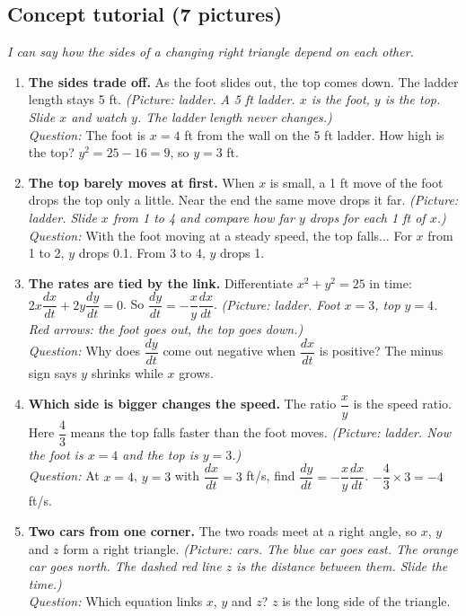 \documentclass[11pt]{article}
\begin{document}
\subsection*{Concept tutorial (7 pictures)}
\textit{I can say how the sides of a changing right triangle depend on each other.}\par
\begin{enumerate}
\item \textbf{The sides trade off.} As the foot slides out, the top comes down. The ladder length stays 5 ft. \textit{(Picture: ladder. A 5 ft ladder. $x$ is the foot, $y$ is the top. Slide $x$ and watch $y$. The ladder length never changes.)}\\ \textit{Question:} The foot is $x=4$ ft from the wall on the 5 ft ladder. How high is the top?  $y^2=25-16=9$, so $y=3$ ft.
\item \textbf{The top barely moves at first.} When $x$ is small, a 1 ft move of the foot drops the top only a little. Near the end the same move drops it far. \textit{(Picture: ladder. Slide $x$ from 1 to 4 and compare how far $y$ drops for each 1 ft of $x$.)}\\ \textit{Question:} With the foot moving at a steady speed, the top falls...  For $x$ from 1 to 2, $y$ drops 0.1. From 3 to 4, $y$ drops 1.
\item \textbf{The rates are tied by the link.} Differentiate $x^2+y^2=25$ in time: $2x\dfrac{dx}{dt}+2y\dfrac{dy}{dt}=0$. So $\dfrac{dy}{dt}=-\dfrac{x}{y}\dfrac{dx}{dt}$. \textit{(Picture: ladder. Foot $x=3$, top $y=4$. Red arrows: the foot goes out, the top goes down.)}\\ \textit{Question:} Why does $\dfrac{dy}{dt}$ come out negative when $\dfrac{dx}{dt}$ is positive?  The minus sign says $y$ shrinks while $x$ grows.
\item \textbf{Which side is bigger changes the speed.} The ratio $\dfrac{x}{y}$ is the speed ratio. Here $\dfrac43$ means the top falls faster than the foot moves. \textit{(Picture: ladder. Now the foot is $x=4$ and the top is $y=3$.)}\\ \textit{Question:} At $x=4$, $y=3$ with $\dfrac{dx}{dt}=3$ ft/s, find $\dfrac{dy}{dt}=-\dfrac{x}{y}\dfrac{dx}{dt}$.  $-\dfrac43\times3=-4$ ft/s.
\item \textbf{Two cars from one corner.} The two roads meet at a right angle, so $x$, $y$ and $z$ form a right triangle. \textit{(Picture: cars. The blue car goes east. The orange car goes north. The dashed red line $z$ is the distance between them. Slide the time.)}\\ \textit{Question:} Which equation links $x$, $y$ and $z$?  $z$ is the long side of the triangle.

\end{enumerate}
\end{document}
